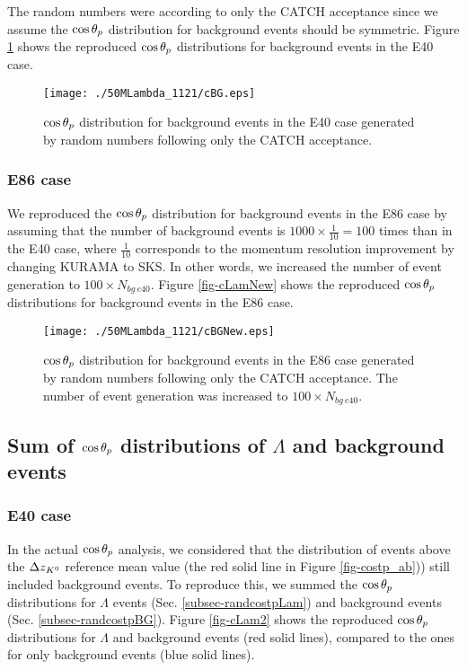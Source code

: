 The random numbers were according to only the CATCH acceptance since we assume the $\cos{\theta_p}$ distribution for background events should be symmetric. Figure \ref{fig-cBG} shows the reproduced $\cos{\theta_p}$ distributions for background events in the E40 case. 

\begin{figure}[h]
  \centering
  \texttt{[image: ./50MLambda\_1121/cBG.eps]}
  \caption{$\cos{\theta_p}$ distribution for background events in the E40 case generated by random numbers following only the CATCH acceptance. %
  }
  \label{fig-cBG}
\end{figure}

\subsubsection{E86 case}
We reproduced the $\cos{\theta_p}$ distribution for background events in the E86 case by assuming that the number of background events is $1000\times\frac{1}{10}=100$ times than in the E40 case, where $\frac{1}{10}$ corresponds to the momentum resolution improvement by changing KURAMA to SKS. In other words, we increased the number of event generation to $100\times N_{bg\ e40}$. Figure \ref{fig-cLamNew} shows the reproduced $\cos{\theta_p}$ distributions for background events in the E86 case.

\begin{figure}[h]
  \centering
  \texttt{[image: ./50MLambda\_1121/cBGNew.eps]}
  \caption{$\cos{\theta_p}$ distribution for background events in the E86 case generated by random numbers following only the CATCH acceptance. The number of event generation was increased to $100\times N_{bg\ e40}$.}
  \label{fig-cBGNew}
\end{figure}


\subsection{Sum of $\cos{\theta_p}$ distributions of $\Lambda$ and background events}
\subsubsection{E40 case}
\label{subsubsec-sume40}
In the actual $\cos{\theta_p}$ analysis, we considered that the distribution of events above the $\Delta z_{K^{0}}$ reference mean value (the red solid line in Figure \ref{fig-costp_ab})) still included background events. To reproduce this, we summed the $\cos{\theta_p}$ distributions for $\Lambda$ events (Sec. \ref{subsec-randcostpLam}) and background events (Sec. \ref{subsec-randcostpBG}). Figure \ref{fig-cLam2} shows the reproduced $\cos{\theta_p}$ distributions for $\Lambda$ and background events (red solid lines), compared to the ones for only background events (blue solid lines). 


